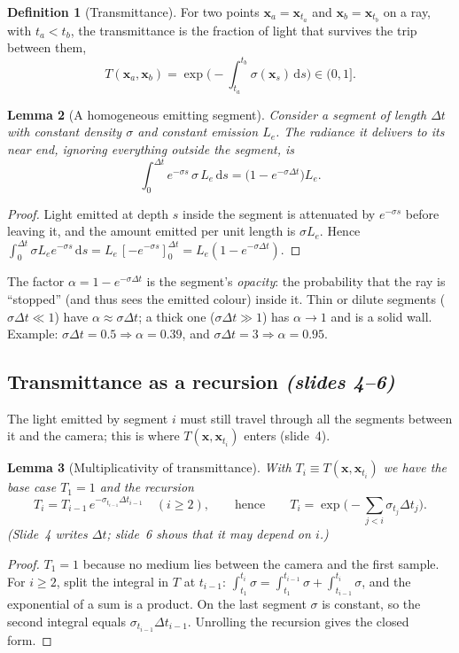 \documentclass[11pt,a4paper]{article}
\newcommand{\sref}[1]{\texorpdfstring{\emph{(slides #1)}}{(slides #1)}}
\newcommand{\dif}{\,\mathrm{d}}
\newcommand{\xx}{\boldsymbol{x}}
\newcommand{\Le}{L_e}
\theoremstyle{definition}
\newtheorem{definition}{Definition}[section]
\theoremstyle{plain}
\newtheorem{lemma}[definition]{Lemma}
\theoremstyle{remark}
\begin{document}
\begin{definition}[Transmittance]
For two points $\xx_a=\xx_{t_a}$ and $\xx_b=\xx_{t_b}$ on a ray, with $t_a<t_b$, the transmittance is the fraction of light that survives the trip between them,
\[
T(\xx_a,\xx_b)=\exp\!\Big(-\!\int_{t_a}^{t_b}\sigma(\xx_s)\dif s\Big)\in(0,1].
\]
\end{definition}

\begin{lemma}[A homogeneous emitting segment]\label{lem:segment}
Consider a segment of length $\Delta t$ with constant density $\sigma$ and constant emission $\Le$. The radiance it delivers to its near end, ignoring everything outside the segment, is
\[
\int_0^{\Delta t} e^{-\sigma s}\,\sigma\,\Le\dif s=\big(1-e^{-\sigma\Delta t}\big)\Le .
\]
\end{lemma}
\begin{proof}
Light emitted at depth $s$ inside the segment is attenuated by $e^{-\sigma s}$ before leaving it, and the amount emitted per unit length is $\sigma\Le$. Hence $\int_0^{\Delta t}\sigma\Le e^{-\sigma s}\dif s=\Le\,[-e^{-\sigma s}]_0^{\Delta t}=\Le(1-e^{-\sigma\Delta t})$.
\end{proof}

\begin{intuition}
The factor $\alpha=1-e^{-\sigma\Delta t}$ is the segment's \emph{opacity}: the probability that the ray is ``stopped'' (and thus sees the emitted colour) inside it. Thin or dilute segments ($\sigma\Delta t\ll1$) have $\alpha\approx\sigma\Delta t$; a thick one ($\sigma\Delta t\gg1$) has $\alpha\to1$ and is a solid wall. Example: $\sigma\Delta t=0.5\Rightarrow\alpha=0.39$, and $\sigma\Delta t=3\Rightarrow\alpha=0.95$.
\end{intuition}

\subsection{Transmittance as a recursion \sref{4--6}}

The light emitted by segment $i$ must still travel through all the segments between it and the camera; this is where $T(\xx,\xx_{t_i})$ enters (slide~4).

\begin{lemma}[Multiplicativity of transmittance]\label{lem:mult}
With $T_i\equiv T(\xx,\xx_{t_i})$ we have the base case $T_1=1$ and the recursion
\[
T_i=T_{i-1}\,e^{-\sigma_{t_{i-1}}\Delta t_{i-1}}\quad(i\ge2),\qquad\text{hence}\qquad T_i=\exp\!\Big(-\sum_{j<i}\sigma_{t_j}\Delta t_j\Big).
\]
(Slide~4 writes $\Delta t$; slide~6 shows that it may depend on $i$.)
\end{lemma}
\begin{proof}
$T_1=1$ because no medium lies between the camera and the first sample. For $i\ge2$, split the integral in $T$ at $t_{i-1}$: $\int_{t_1}^{t_i}\sigma=\int_{t_1}^{t_{i-1}}\sigma+\int_{t_{i-1}}^{t_i}\sigma$, and the exponential of a sum is a product. On the last segment $\sigma$ is constant, so the second integral equals $\sigma_{t_{i-1}}\Delta t_{i-1}$. Unrolling the recursion gives the closed form.
\end{proof}
\end{document}
